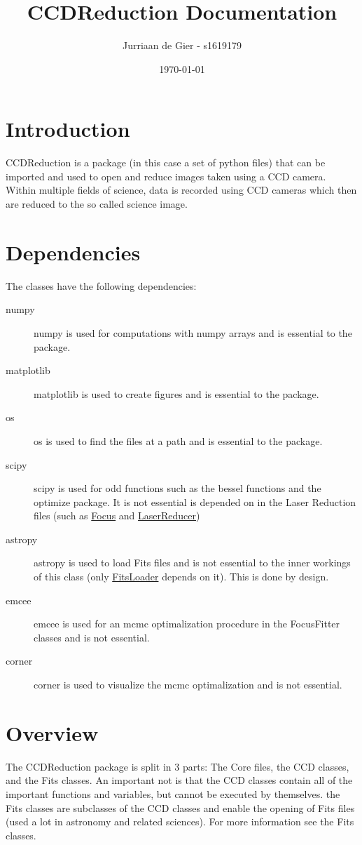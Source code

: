 \documentclass[11pt]{article}
\title{CCDReduction Documentation\\} %
\author{Jurriaan de Gier - s1619179\\} %
\date{\today\\}
\begin{document}
\maketitle
\thispagestyle{empty}
\titlepage
\clearpage
\section{Introduction}
CCDReduction is a package (in this case a set of python files) that can be imported and used to open and reduce images taken using a CCD camera. Within multiple fields of science, data is recorded using CCD cameras which then are reduced to the so called science image.


\section{Dependencies}
The classes have the following dependencies:
\begin{description}
\item [numpy] numpy is used for computations with numpy arrays and is essential to the package.
\item [matplotlib] matplotlib is used to create figures and is essential to the package.
\item [os] os is used to find the files at a path and is essential to the package.
\item [scipy] scipy is used for odd functions such as the bessel functions and the optimize package. It is not essential is depended on in the Laser Reduction files (such as \ul{Focus} and \ul{LaserReducer})
\item [astropy] astropy is used to load Fits files and is not essential to the inner workings of this class (only \ul{FitsLoader} depends on it). This is done by design.
\item [emcee] emcee is used for an mcmc optimalization procedure in the FocusFitter classes and is not essential.
\item [corner] corner is used to visualize the mcmc optimalization and is not essential.
\end{description}


\section{Overview}
The CCDReduction package is split in 3 parts: The Core files, the CCD classes, and the Fits classes. An important not is that the CCD classes contain all of the important functions and variables, but cannot be executed by themselves. the Fits classes are subclasses of the CCD classes and enable the opening of Fits files (used a lot in astronomy and related sciences). For more information see the Fits classes.
\end{document}
